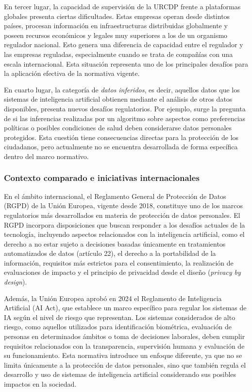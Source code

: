 \documentclass[11pt,a4paper]{article}
\begin{document}
En tercer lugar, la capacidad de supervisión de la URCDP frente a plataformas globales presenta ciertas dificultades. Estas empresas operan desde distintos países, procesan información en infraestructuras distribuidas globalmente y poseen recursos económicos y legales muy superiores a los de un organismo regulador nacional. Esto genera una diferencia de capacidad entre el regulador y las empresas reguladas, especialmente cuando se trata de compañías con una escala internacional. Esta situación representa uno de los principales desafíos para la aplicación efectiva de la normativa vigente.

En cuarto lugar, la categoría de \textit{datos inferidos}, es decir, aquellos datos que los sistemas de inteligencia artificial obtienen mediante el análisis de otros datos disponibles, presenta nuevos desafíos regulatorios. Por ejemplo, surge la pregunta de si las inferencias realizadas por un algoritmo sobre aspectos como preferencias políticas o posibles condiciones de salud deben considerarse datos personales protegidos. Esta cuestión tiene consecuencias directas para la protección de los ciudadanos, pero actualmente no se encuentra desarrollada de forma específica dentro del marco normativo.

\subsubsection{Contexto comparado e iniciativas internacionales}

En el ámbito internacional, el Reglamento General de Protección de Datos (RGPD) de la Unión Europea, vigente desde 2018, constituye uno de los marcos regulatorios más desarrollados en materia de protección de datos personales. El RGPD incorpora disposiciones que buscan responder a los desafíos actuales de la tecnología, incluyendo aspectos relacionados con la inteligencia artificial, como el derecho a no estar sujeto a decisiones basadas únicamente en tratamientos automatizados de datos (artículo 22), el derecho a la portabilidad de la información, requisitos más estrictos para el consentimiento, la realización de evaluaciones de impacto y el principio de privacidad desde el diseño (\textit{privacy by design}).

Además, la Unión Europea aprobó en 2024 el Reglamento de Inteligencia Artificial (AI Act), que establece un marco específico para regular los sistemas de IA según el nivel de riesgo que representan. Los sistemas considerados de alto riesgo, como aquellos utilizados para identificación biométrica, evaluación de personas en determinados ámbitos o toma de decisiones laborales, deben cumplir requisitos relacionados con la transparencia, supervisión humana y evaluación de su funcionamiento. Esta normativa introduce un enfoque diferente, ya que no se limita únicamente a la protección de datos personales, sino que también regula el desarrollo y uso de sistemas de inteligencia artificial considerando sus posibles impactos en la sociedad.
\end{document}
